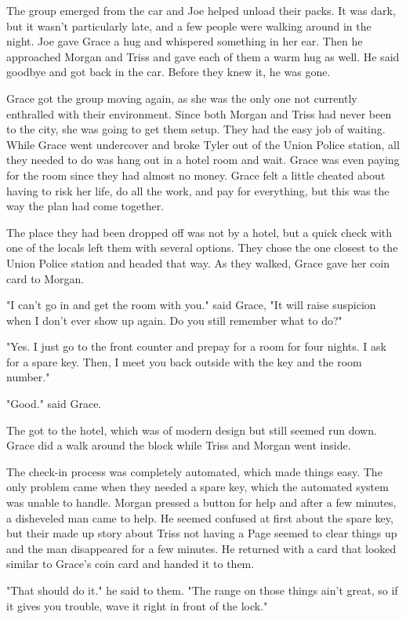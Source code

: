 \documentclass[courier]{sffms}
\begin{document}
The group emerged from the car and Joe helped unload
their packs. It was dark, but it wasn't particularly late, and
a few people were walking around in the night. Joe gave
Grace a hug and whispered something in her ear. Then he
approached Morgan and Triss and gave each of them a
warm hug as well. He said goodbye and got back in the car.
Before they knew it, he was gone.

Grace got the group moving again, as she was the only
one not currently enthralled with their environment.
Since both Morgan and Triss had never been to the city,
she was going to get them setup. They had the easy
job of waiting. While Grace went undercover and broke
Tyler out of the Union Police station, all they needed to
do was hang out in a hotel room and wait. Grace was 
even paying for the room since they had almost no
money. Grace felt a little cheated about having to risk
her life, do all the work, and pay for everything,
but this was the way the plan had come together.

The place they had been dropped off was not by a
hotel, but a quick check with one of the locals left them
with several options. They chose the one closest to the
Union Police station and headed that way. As they
walked, Grace gave her coin card to Morgan.

"I can't go in and get the room with you." said Grace,
"It will raise suspicion when I don't ever show up again.
Do you still remember what to do?"

"Yes. I just go to the front counter and prepay for a room
for four nights. I ask for a spare key. Then, I meet you
back outside with the key and the room number."

"Good." said Grace.

The got to the hotel, which was of modern design but
still seemed run down. Grace did a walk around the
block while Triss and Morgan went inside.

The check-in process was completely automated, which
made things easy. The only problem came when they
needed a spare key, which the automated system was
unable to handle. Morgan pressed a button for help
and after a few minutes, a disheveled man came to
help. He seemed confused at first about the spare key,
but their made up story about Triss not having a Page
seemed to clear things up and the man disappeared for
a few minutes. He returned with a card that looked 
similar to Grace's coin card and handed it to them.

"That should do it." he said to them. "The range on those
things ain't great, so if it gives you trouble, wave it right
in front of the lock."
\end{document}
